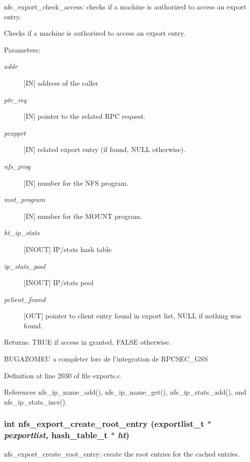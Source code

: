 nfs\_\-export\_\-check\_\-access: checks if a machine is authorized to access an export entry.

Checks if a machine is authorized to access an export entry.

\begin{Desc}
\item[Parameters:]
\begin{description}
\item[{\em addr}][IN] address of the caller \item[{\em ptr\_\-req}][IN] pointer to the related RPC request. \item[{\em pexpprt}][IN] related export entry (if found, NULL otherwise). \item[{\em nfs\_\-prog}][IN] number for the NFS program. \item[{\em mnt\_\-program}][IN] number for the MOUNT program. \item[{\em ht\_\-ip\_\-stats}][INOUT] IP/stats hash table \item[{\em ip\_\-stats\_\-pool}][INOUT] IP/stats pool \item[{\em pclient\_\-found}][OUT] pointer to client entry found in export list, NULL if nothing was found.\end{description}
\end{Desc}
\begin{Desc}
\item[Returns:]TRUE if access in granted, FALSE otherwise.\end{Desc}


BUGAZOMEU a completer lors de l'integration de RPCSEC\_\-GSS 

Definition at line 2030 of file exports.c.

References nfs\_\-ip\_\-name\_\-add(), nfs\_\-ip\_\-name\_\-get(), nfs\_\-ip\_\-stats\_\-add(), and nfs\_\-ip\_\-stats\_\-incr().
\subsubsection{\setlength{\rightskip}{0pt plus 5cm}int nfs\_\-export\_\-create\_\-root\_\-entry (exportlist\_\-t $\ast$ {\em pexportlist}, hash\_\-table\_\-t $\ast$ {\em ht})}\label{exports_8c_a75}


nfs\_\-export\_\-create\_\-root\_\-entry: create the root entries for the cached entries.

